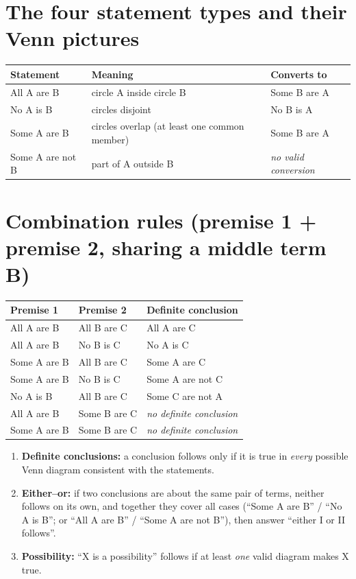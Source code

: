 \documentclass[11pt,a4paper,openany]{report}
\begin{document}
\section{The four statement types and their Venn pictures}
\begin{center}\small
\begin{tabular}{lll}
\toprule Statement & Meaning & Converts to\\\midrule
All A are B & circle A inside circle B & Some B are A\\
No A is B & circles disjoint & No B is A\\
Some A are B & circles overlap (at least one common member) & Some B are A\\
Some A are not B & part of A outside B & \emph{no valid conversion}\\
\bottomrule
\end{tabular}
\end{center}

\section{Combination rules (premise 1 + premise 2, sharing a middle term B)}
\begin{center}\small
\begin{tabular}{lll}
\toprule Premise 1 & Premise 2 & Definite conclusion\\\midrule
All A are B & All B are C & All A are C\\
All A are B & No B is C & No A is C\\
Some A are B & All B are C & Some A are C\\
Some A are B & No B is C & Some A are not C\\
No A is B & All B are C & Some C are not A\\
All A are B & Some B are C & \emph{no definite conclusion}\\
Some A are B & Some B are C & \emph{no definite conclusion}\\
\bottomrule
\end{tabular}
\end{center}

\begin{idea}
\begin{enumerate}[nosep]
\item \textbf{Definite conclusions:} a conclusion follows only if it is true in \emph{every} possible Venn diagram consistent with the statements.
\item \textbf{Either--or:} if two conclusions are about the same pair of terms, neither follows on its own, and together they cover all cases (``Some A are B'' / ``No A is B''; or ``All A are B'' / ``Some A are not B''), then answer ``either I or II follows''.
\item \textbf{Possibility:} ``X is a possibility'' follows if at least \emph{one} valid diagram makes X true.
\end{enumerate}
\end{idea}
\end{document}
